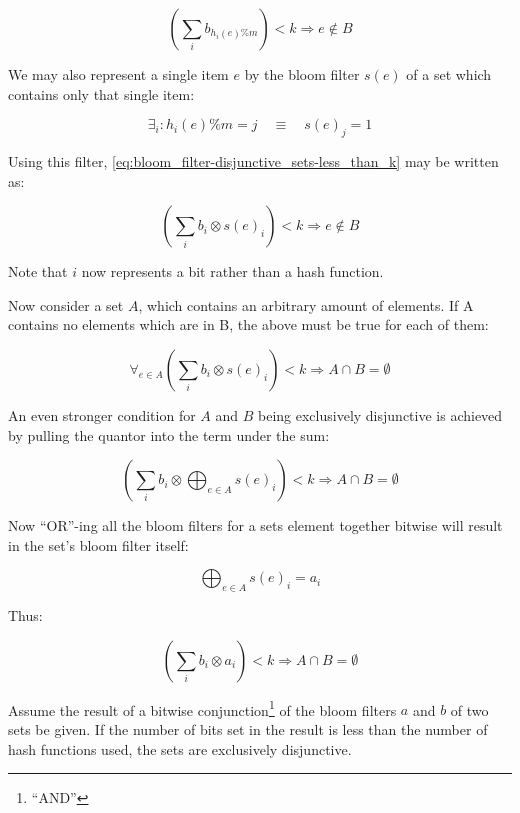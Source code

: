         \begin{equation}
            \left( \sum_i b_{h_i(e)\%m} \right) < k \Rightarrow e \notin B
            \label{eq:bloom_filter-disjunctive_sets-less_than_k}
        \end{equation}

        We may also represent a single item $e$ by the bloom filter $s(e)$ of a
        set which contains only that single item:

        \begin{equation}
            \exists_i : h_i(e)\%m = j \quad\equiv\quad s(e)_j = 1
        \end{equation}

        Using this filter, \ref{eq:bloom_filter-disjunctive_sets-less_than_k}
        may be written as:

        \begin{equation}
            \left( \sum_i b_i \otimes s(e)_i \right) < k \Rightarrow e \notin B
        \end{equation}

        Note that $i$ now represents a bit rather than a hash function.

        Now consider a set $A$, which contains an arbitrary amount of elements.
        If A contains no elements which are in B, the above must be true for
        each of them:

        \begin{equation}
            \forall_{e \in A} \left( \sum_i b_i \otimes s(e)_i \right) < k
            \Rightarrow A \cap B = \emptyset
        \end{equation}

        An even stronger condition for $A$ and $B$ being exclusively disjunctive
        is achieved by pulling the quantor into the term under the sum:

        \begin{equation}
            \left( \sum_i b_i \otimes \bigoplus_{e \in A} s(e)_i \right) < k
            \Rightarrow A \cap B = \emptyset
        \end{equation}

        Now ``OR''-ing all the bloom filters for a sets element together bitwise
        will result in the set's bloom filter itself:

        \begin{equation}
            \bigoplus_{e \in A} s(e)_i = a_i
        \end{equation}

        Thus:

        \begin{equation}
            \left( \sum_i b_i \otimes a_i \right) < k
            \Rightarrow A \cap B = \emptyset
            \label{eq:bloom_filter-disjunctive_sets-bitwise_and}
        \end{equation}

        Assume the result of a bitwise conjunction\footnote{``AND''} of the
        bloom filters $a$ and $b$ of two sets be given. If the number of bits
        set in the result is less than the number of hash functions used, the
        sets are exclusively disjunctive.


